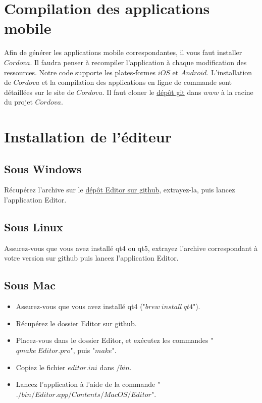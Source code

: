 \documentclass[11pt]{article}
\begin{document}
\section{Compilation des applications mobile}

Afin de générer les applications mobile correspondantes, il vous faut installer $Cordova$. Il faudra penser à recompiler l'application à chaque modification des ressources. Notre code supporte les plates-formes $iOS$ et $Android$. L'installation de $Cordova$ et la compilation des applications en ligne de commande sont détaillées sur le site de \href{http://cordova.apache.org/docs/en/3.5.0/guide_cli_index.md.html#The%20Command-Line%20Interface}{$Cordova$}.
	Il faut cloner le \href{https://github.com/ProjetCristallo/CrystalMaze}{dépôt git} dans $www$ à la racine du projet $Cordova$. 

\section{Installation de l'éditeur}
\subsection{Sous Windows}
Récupérez l'archive sur le \href{https://github.com/ProjetCristallo/Editor/releases}{dépôt Editor sur github}, extrayez-la, puis lancez l'application Editor.
\subsection{Sous Linux}
Assurez-vous que vous avez installé qt4 ou qt5, extrayez l'archive correspondant à votre version sur github puis lancez l'application Editor.
\subsection{Sous Mac}
\begin{itemize}
\item Assurez-vous que vous avez installé qt4 ("$brew\ install\ qt4$").
\item Récupérez le dossier Editor sur github.
\item Placez-vous dans le dossier Editor, et exécutez les commandes "$qmake\ Editor.pro$", puis "$make$".
\item Copiez le fichier $editor.ini$ dans $/bin$.
\item Lancez l'application à l'aide de la commande "$./bin/Editor.app/Contents/MacOS/Editor$".
\end{itemize}
\end{document}
